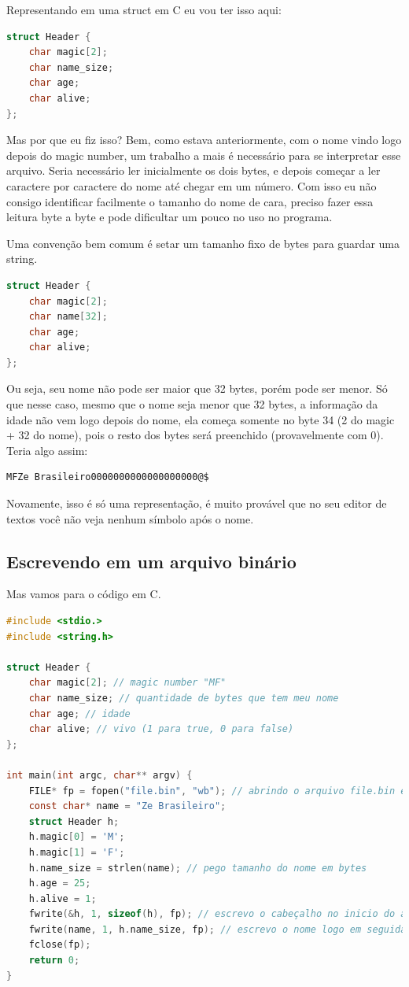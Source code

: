 \documentclass[a4paper,oneside,12pt]{article}
\begin{document}
Representando em uma struct em C eu vou ter isso aqui:
\begin{lstlisting}[language=C, caption=Cabeçalho em C]
struct Header {
    char magic[2];
    char name_size;
    char age;
    char alive;
};
\end{lstlisting}

Mas por que eu fiz isso? Bem, como estava anteriormente, com o nome vindo logo depois do magic number, um trabalho a mais é necessário para se interpretar esse arquivo. Seria necessário ler inicialmente os dois bytes, e depois começar a ler caractere por caractere do nome até chegar em um número. Com isso eu não consigo identificar facilmente o tamanho do nome de cara, preciso fazer essa leitura byte a byte e pode dificultar um pouco no uso no programa.

Uma convenção bem comum é setar um tamanho fixo de bytes para guardar uma string.

\begin{lstlisting}[language=C, caption=Cabeçalho com tamanho fixo de string]
struct Header {
    char magic[2];
    char name[32];
    char age;
    char alive;
};
\end{lstlisting}

Ou seja, seu nome não pode ser maior que 32 bytes, porém pode ser menor. Só que nesse caso, mesmo que o nome seja menor que 32 bytes, a informação da idade não vem logo depois do nome, ela começa somente no byte 34 (2 do magic + 32 do nome), pois o resto dos bytes será preenchido (provavelmente com 0). Teria algo assim:

\begin{lstlisting}
MFZe Brasileiro0000000000000000000@$
\end{lstlisting}

Novamente, isso é só uma representação, é muito provável que no seu editor de textos você não veja nenhum símbolo após o nome.

\subsection{Escrevendo em um arquivo binário}

Mas vamos para o código em C.

\begin{lstlisting}[language=C, caption=Exemplo de escrita em C]
#include <stdio.>
#include <string.h>

struct Header {
    char magic[2]; // magic number "MF"
    char name_size; // quantidade de bytes que tem meu nome
    char age; // idade
    char alive; // vivo (1 para true, 0 para false)
};

int main(int argc, char** argv) {
    FILE* fp = fopen("file.bin", "wb"); // abrindo o arquivo file.bin em modo de escrita binária
    const char* name = "Ze Brasileiro";
    struct Header h;
    h.magic[0] = 'M';
    h.magic[1] = 'F';
    h.name_size = strlen(name); // pego tamanho do nome em bytes
    h.age = 25;
    h.alive = 1;
    fwrite(&h, 1, sizeof(h), fp); // escrevo o cabeçalho no inicio do arquivo
    fwrite(name, 1, h.name_size, fp); // escrevo o nome logo em seguida
    fclose(fp);
    return 0;
}
\end{lstlisting}
\end{document}
